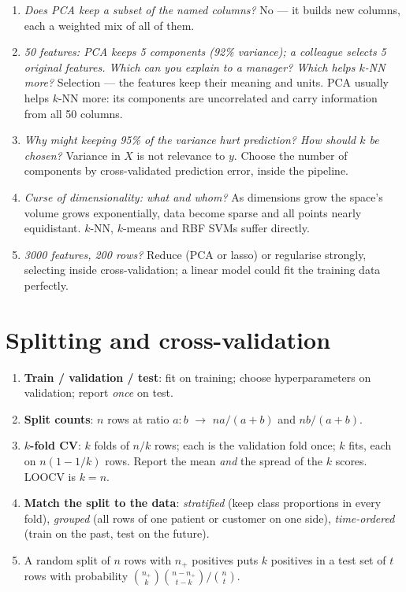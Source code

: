 \documentclass[11pt]{article}
\newcommand{\method}[1]{\begin{keyidea}[The method: #1]}
\begin{document}
\begin{concept}
\begin{enumerate}[label=\textbf{C13.\arabic*}]
  \item \emph{Does PCA keep a subset of the named columns?} No --- it builds
    new columns, each a weighted mix of all of them.
  \item \emph{50 features: PCA keeps 5 components (92\% variance); a colleague
    selects 5 original features. Which can you explain to a manager? Which
    helps $k$-NN more?} Selection --- the features keep their meaning and
    units. PCA usually helps $k$-NN more: its components are uncorrelated and
    carry information from all 50 columns.
  \item \emph{Why might keeping 95\% of the variance hurt prediction? How
    should $k$ be chosen?} Variance in $X$ is not relevance to $y$. Choose the
    number of components by cross-validated prediction error, inside the
    pipeline.
  \item \emph{Curse of dimensionality: what and whom?} As dimensions grow the
    space's volume grows exponentially, data become sparse and all points
    nearly equidistant. $k$-NN, $k$-means and RBF SVMs suffer directly.
  \item \emph{3000 features, 200 rows?} Reduce (PCA or lasso) or regularise
    strongly, selecting inside cross-validation; a linear model could fit the
    training data perfectly.
\end{enumerate}
\end{concept}

\section{Splitting and cross-validation}
\label{sec:splits}

\method{honest evaluation}
\begin{enumerate}
  \item \textbf{Train / validation / test}: fit on training; choose
    hyperparameters on validation; report \emph{once} on test.
  \item \textbf{Split counts}: $n$ rows at ratio $a{:}b$ $\to$ $na/(a+b)$ and
    $nb/(a+b)$.
  \item \textbf{$k$-fold CV}: $k$ folds of $n/k$ rows; each is the
    validation fold once; $k$ fits, each on $n(1 - 1/k)$ rows. Report the
    mean \emph{and} the spread of the $k$ scores. LOOCV is $k = n$.
  \item \textbf{Match the split to the data}: \emph{stratified} (keep class
    proportions in every fold), \emph{grouped} (all rows of one patient or
    customer on one side), \emph{time-ordered} (train on the past, test on the
    future).
  \item A random split of $n$ rows with $n_+$ positives puts $k$ positives in
    a test set of $t$ rows with probability
    $\binom{n_+}{k}\binom{n - n_+}{t - k}/\binom nt$.
\end{enumerate}
\end{keyidea}
\end{document}
